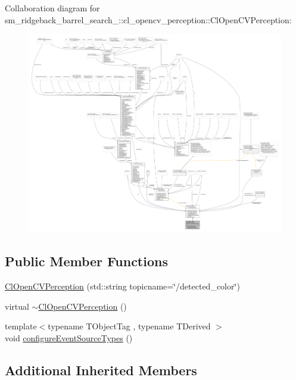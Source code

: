 Collaboration diagram for sm\+\_\+ridgeback\+\_\+barrel\+\_\+search\+\_\+:\+:cl\+\_\+opencv\+\_\+perception\+:\+:Cl\+Open\+C\+V\+Perception\+:
\nopagebreak
\begin{figure}[H]
\begin{center}
\leavevmode
\includegraphics[width=350pt]{classsm__ridgeback__barrel__search__1_1_1cl__opencv__perception_1_1ClOpenCVPerception__coll__graph}
\end{center}
\end{figure}
\subsection*{Public Member Functions}
\begin{DoxyCompactItemize}
\item 
\hyperlink{classsm__ridgeback__barrel__search__1_1_1cl__opencv__perception_1_1ClOpenCVPerception_a411b75a84686141faea2f3ee9e035408}{Cl\+Open\+C\+V\+Perception} (std\+::string topicname=\char`\"{}/detected\+\_\+color\char`\"{})
\item 
virtual \hyperlink{classsm__ridgeback__barrel__search__1_1_1cl__opencv__perception_1_1ClOpenCVPerception_a9bb0bdf341e26653fd3717f8fbb03eac}{$\sim$\+Cl\+Open\+C\+V\+Perception} ()
\item 
{\footnotesize template$<$typename T\+Object\+Tag , typename T\+Derived $>$ }\\void \hyperlink{classsm__ridgeback__barrel__search__1_1_1cl__opencv__perception_1_1ClOpenCVPerception_a26ddc6b2a55eecb5bec229d037f6d678}{configure\+Event\+Source\+Types} ()
\end{DoxyCompactItemize}
\subsection*{Additional Inherited Members}


